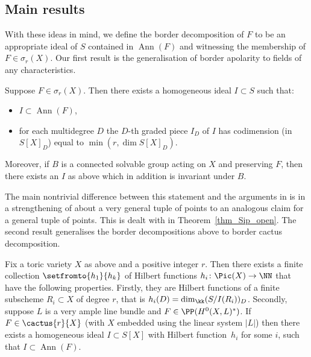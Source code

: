 \documentclass[12pt,a4paper]{article}
\newcommand{\apolar}[1][F]{\operatorname{Ann}\left(#1\right)}
\begin{document}
\subsection{Main results}

With these ideas in mind, we define the border decomposition of $F$ to be an appropriate ideal of $S$ contained in  $\apolar$ and witnessing the membership of $F\in \sigma_r(X)$.
Our first result is the generalisation of border apolarity \cite[Thm~1.2]{nisiabu_jabu_border_apolarity} to fields of any characteristics.
\begin{thm}
    \label{thm_border_apolarity_intro}
    Suppose $F\in \sigma_r(X)$.
    Then there exists a homogeneous ideal $I \subset S$ such that:
    \begin{itemize}
     \item $I\subset \apolar$,
     \item for each multidegree $D$ the $D$-th graded piece $I_D$ of $I$
           has codimension (in $S[X]_D$) equal to $\min(r, \dim S[X]_D)$.
    \end{itemize}
    Moreover, if $B$ is a connected solvable group acting on $X$ and preserving $F$,
      then there exists an $I$ as above which in addition is invariant under
      $B$.
\end{thm}
The main nontrivial difference between this statement and the arguments in \cite{nisiabu_jabu_border_apolarity}
is in a strengthening of \cite[Lem.~3.9]{nisiabu_jabu_border_apolarity} about a very general tuple of points to an analogous claim for a general tuple of points.
This is dealt with in Theorem~\ref{thm_Sip_open}.
The second result generalises the border decompositions above to border cactus decomposition.

\begin{thm}\label{thm_weak_abcd}
   Fix a toric variety $X$ as above and a positive integer $r$.
   Then there exists a finite collection $\setfromto{h_1}{h_k}$ of Hilbert functions
   $h_i\colon \Pic(X)\to \NN$
     that have the following properties.
   Firstly, they are Hilbert functions of a finite subscheme $R_i\subset X$ of degree $r$, that is $h_i(D)= \dim_{\kk}(S/I(R_i))_D$.
   Secondly, suppose $L$ is a very ample line bundle and
     $F \in \PP(H^0(X,L)^*)$.
     If  $F \in \cactus{r}{X}$ (with $X$ embedded using the linear system $|L|$)
     then there exists a homogeneous ideal
     $I \subset S[X]$
     with Hilbert function~$h_i$ for some $i$,
   such that $I \subset \apolar$.
\end{thm}
\end{document}
